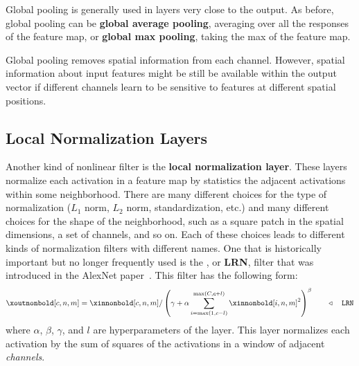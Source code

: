 Global pooling is generally used in layers very close to the output. As before, global pooling can be {\bf global average pooling}, averaging over all the responses of the feature map, or {\bf global max pooling}, taking the max of the feature map.   

Global pooling removes spatial information from each channel. However, spatial information about input features might be still be available within the output vector if different channels learn to be sensitive to features at different spatial positions. 

\subsection{Local Normalization Layers}

Another kind of nonlinear filter is the {\bf local normalization layer}. These layers normalize each activation in a feature map by statistics the adjacent activations within some neighborhood. There are many different choices for the type of normalization ($L_1$ norm, $L_2$ norm, standardization, etc.) and many different choices for the shape of the neighborhood, such as a square patch in the spatial dimensions, a set of channels, and so on. Each of these choices leads to different kinds of normalization filters with different names. One that is historically important but no longer frequently used is the , or {\bf LRN}, filter that was introduced in the AlexNet paper~\cite{krizhevsky2012imagenet}. This filter has the following form:
\begin{align}
    \xoutnonbold[c,n,m] = \xinnonbold[c,n,m] / \left( \gamma + \alpha \sum_{i=\max(1,c-l)}^{\max(C,c+l)} \xinnonbold[i,n,m]^2 \right) ^\beta \quad\quad \triangleleft \quad\texttt{LRN} \label{eqn:convolutional_neural_nets:LRN}
\end{align}
where $\alpha$, $\beta$, $\gamma$, and $l$ are hyperparameters of the layer. This layer normalizes each activation by the sum of squares of the activations in a window of adjacent \textit{channels}.

